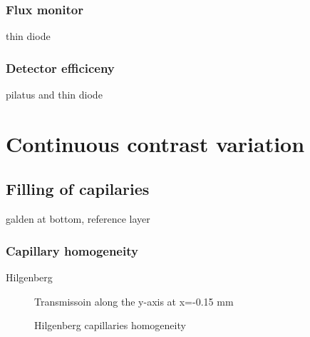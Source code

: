 \subsubsection{Flux monitor}
thin diode
\subsubsection{Detector efficiceny}
pilatus and thin diode

\section{Continuous contrast variation}
\subsection{Filling of capilaries}
galden at bottom, reference layer
\subsubsection{Capillary homogeneity}
Hilgenberg
\begin{figure}%
	\centering
		
		\caption{Transmissoin along the y-axis at x=-0.15 mm}
		\label{fig:GaldenCalibration}
\end{figure}


\begin{figure}%
	\centering
		\caption{Hilgenberg capillaries homogeneity}
\end{figure}

